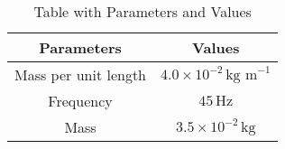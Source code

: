 \documentclass{article}
\begin{document}
\begin{table}[htbp]
    \centering
    \begin{tabular}{|c|c|}
        \hline
        \textbf{Parameters} & \textbf{Values} \\
        \hline
        Mass per unit length & $4.0 \times 10^{-2} \, \text{kg m}^{-1}$ \\
        \hline
        Frequency & $45 \, \text{Hz}$ \\
        \hline
        Mass & $3.5 \times 10^{-2} \, \text{kg}$ \\
        \hline
    \end{tabular}
    \caption{Table with Parameters and Values}
    \label{tab:mytable}
\end{table}
\end{document}
